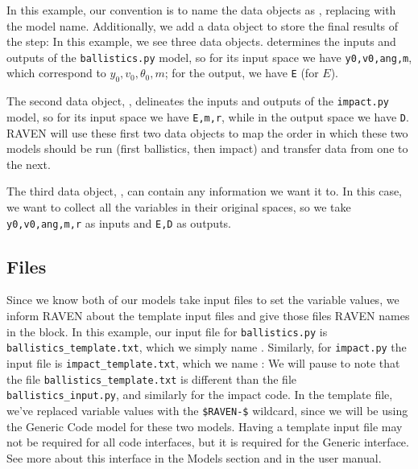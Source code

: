 In this
example, our convention is to name the  data objects as , replacing
 with the model name.  Additionally, we add a data object to store the final results of the
 step:
In this example, we see three data objects.   determines the inputs and outputs of the
\texttt{ballistics.py} model, so for its input space we have \texttt{y0,v0,ang,m}, which correspond to
$y_0,v_0,\theta_0,m$; for the output, we have \texttt{E} (for $E$).

The second data object, , delineates the inputs and outputs of the \texttt{impact.py}
model, so for its input space we have \texttt{E,m,r}, while in the output space we have \texttt{D}.  RAVEN
will use these first two data objects to map the order in which these two models should be run (first
ballistics, then impact) and transfer data from one to the next.

The third data object, , can contain any information we want it to.  In this case,
we want to collect all the variables in their original spaces, so we take \texttt{y0,v0,ang,m,r} as inputs and
\texttt{E,D} as outputs.


\subsection{Files}
Since we know both of our models take input files to set the variable values, we inform RAVEN about the
template input files and
give those files RAVEN names in the  block.  In this example, our input file for \texttt{ballistics.py} is
\texttt{ballistics\_template.txt}, which we simply name .  Similarly,
for \texttt{impact.py} the input file is \texttt{impact\_template.txt}, which we name
:
We will pause to note that the file \texttt{ballistics\_template.txt} is different than the file
\texttt{ballistics\_input.py}, and similarly for the impact code.  In the template file, we've replaced
variable values with the \texttt{\$RAVEN-\$} wildcard, since we will be using the Generic Code model for these
two models.  Having a template input file may not be required for all code interfaces, but it is required for
the Generic interface. See more about this interface in the Models section and in the user manual.


